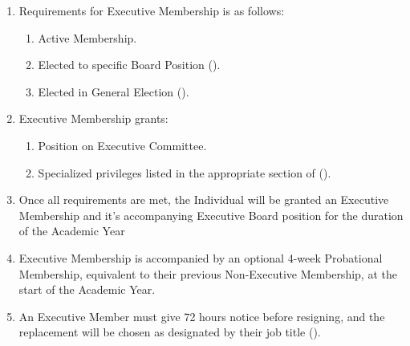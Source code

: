 \begin{enumerate}
	\item Requirements for Executive Membership is as follows:
		\begin{enumerate}
			\item Active Membership.

			\item Elected to specific Board Position ().

			\item Elected in General Election ().
		\end{enumerate}

	\item Executive Membership grants:
		\begin{enumerate}
			\item Position on Executive Committee.

			\item Specialized privileges listed in the appropriate section of ().
		\end{enumerate}

	\item Once all requirements are met, the Individual will be granted an
		Executive Membership and it's accompanying Executive Board position for the
		duration of the Academic Year

	\item Executive Membership is accompanied by an optional 4-week Probational Membership,
		equivalent to their previous Non-Executive Membership, at the start of the Academic
		Year.

	\item An Executive Member must give 72 hours notice before resigning, and the
		replacement will be chosen as designated by their job title ().
\end{enumerate}

